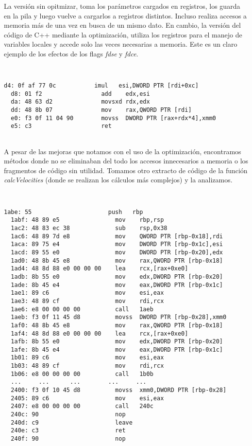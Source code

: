 La versión sin opitmizar, toma los parámetros cargados en registros, los guarda en la pila y luego vuelve a cargarlos a registros distintos. Incluso realiza accesos a memoria más de una vez en busca de un mismo dato.
En cambio, la versión del código de C++ mediante la optimización, utiliza los registros para el manejo de variables locales y accede solo las veces necesarias a memoria. Este es un claro ejemplo de los efectos de los flags \textit{fdse} y \textit{fdce}.


~\\

\begin{lstlisting}[title=Función set de mat2 con optimización -O1]
  d4: 0f af 77 0c           imul   esi,DWORD PTR [rdi+0xc]
  d8: 01 f2                 add    edx,esi
  da: 48 63 d2              movsxd rdx,edx
  dd: 48 8b 07              mov    rax,QWORD PTR [rdi]
  e0: f3 0f 11 04 90        movss  DWORD PTR [rax+rdx*4],xmm0
  e5: c3                    ret  
\end{lstlisting}




~\\

A pesar de las mejoras que notamos con el uso de la optimización, encontramos métodos donde no se eliminaban del todo los accesos innecesarios a memoria o los fragmentos de código sin utilidad. Tomamos otro extracto de código de la función \textit{calcVelocities} (donde se realizan los cálculos más complejos) y la analizamos. 

~\\


\begin{lstlisting}[title=Función calcVelocities]
  1abe:	55                   	push   rbp
  1abf:	48 89 e5             	mov    rbp,rsp
  1ac2:	48 83 ec 38          	sub    rsp,0x38
  1ac6:	48 89 7d e8          	mov    QWORD PTR [rbp-0x18],rdi
  1aca:	89 75 e4             	mov    DWORD PTR [rbp-0x1c],esi
  1acd:	89 55 e0             	mov    DWORD PTR [rbp-0x20],edx
  1ad0:	48 8b 45 e8          	mov    rax,QWORD PTR [rbp-0x18]
  1ad4:	48 8d 88 e0 00 00 00 	lea    rcx,[rax+0xe0]
  1adb:	8b 55 e0             	mov    edx,DWORD PTR [rbp-0x20]
  1ade:	8b 45 e4             	mov    eax,DWORD PTR [rbp-0x1c]
  1ae1:	89 c6                	mov    esi,eax
  1ae3:	48 89 cf             	mov    rdi,rcx
  1ae6:	e8 00 00 00 00       	call   1aeb 
  1aeb:	f3 0f 11 45 d8       	movss  DWORD PTR [rbp-0x28],xmm0
  1af0:	48 8b 45 e8          	mov    rax,QWORD PTR [rbp-0x18]
  1af4:	48 8d 88 e0 00 00 00 	lea    rcx,[rax+0xe0]
  1afb:	8b 55 e0             	mov    edx,DWORD PTR [rbp-0x20]
  1afe:	8b 45 e4             	mov    eax,DWORD PTR [rbp-0x1c]
  1b01:	89 c6                	mov    esi,eax
  1b03:	48 89 cf             	mov    rdi,rcx
  1b06:	e8 00 00 00 00       	call   1b0b 
  ...     ...      ...        ...     ...
  2400:	f3 0f 10 45 d8       	movss  xmm0,DWORD PTR [rbp-0x28]
  2405:	89 c6                	mov    esi,eax
  2407:	e8 00 00 00 00       	call   240c 
  240c:	90                   	nop
  240d:	c9                   	leave  
  240e:	c3                   	ret    
  240f:	90                   	nop
\end{lstlisting}

